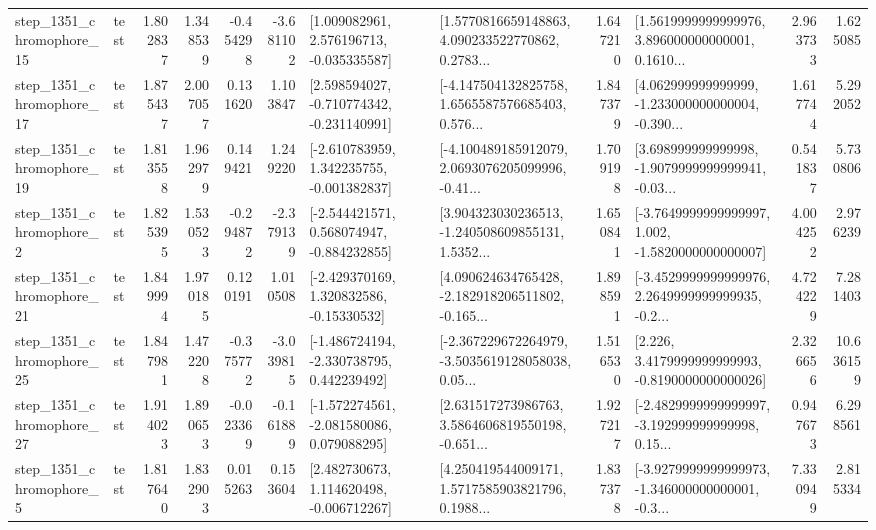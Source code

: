 \begin{tabular}{llrrrrllrlrr}
 step\_1351\_chromophore\_15 &      test &      1.802837 &    1.348539 &     -0.454298 & -3.681102 &    [1.009082961, 2.576196713, -0.035335587] &  [1.5770816659148863, 4.090233522770862, 0.2783... &       1.647210 &  [1.5619999999999976, 3.896000000000001, 0.1610... &            2.963733 &          1.625085 \\
 step\_1351\_chromophore\_17 &      test &      1.875437 &    2.007057 &      0.131620 &  1.103847 &   [2.598594027, -0.710774342, -0.231140991] &  [-4.147504132825758, 1.6565587576685403, 0.576... &       1.847379 &  [4.062999999999999, -1.233000000000004, -0.390... &            1.617744 &          5.292052 \\
 step\_1351\_chromophore\_19 &      test &      1.813558 &    1.962979 &      0.149421 &  1.249220 &   [-2.610783959, 1.342235755, -0.001382837] &  [-4.100489185912079, 2.0693076205099996, -0.41... &       1.709198 &  [3.698999999999998, -1.9079999999999941, -0.03... &            0.541837 &          5.730806 \\
  step\_1351\_chromophore\_2 &      test &      1.825395 &    1.530523 &     -0.294872 & -2.379139 &   [-2.544421571, 0.568074947, -0.884232855] &  [3.904323030236513, -1.240508609855131, 1.5352... &       1.650841 &  [-3.7649999999999997, 1.002, -1.5820000000000007] &            4.004252 &          2.976239 \\
 step\_1351\_chromophore\_21 &      test &      1.849994 &    1.970185 &      0.120191 &  1.010508 &    [-2.429370169, 1.320832586, -0.15330532] &  [4.090624634765428, -2.182918206511802, -0.165... &       1.898591 &  [-3.4529999999999976, 2.2649999999999935, -0.2... &            4.724229 &          7.281403 \\
 step\_1351\_chromophore\_25 &      test &      1.847981 &    1.472208 &     -0.375772 & -3.039815 &   [-1.486724194, -2.330738795, 0.442239492] &  [-2.367229672264979, -3.5035619128058038, 0.05... &       1.516530 &   [2.226, 3.4179999999999993, -0.8190000000000026] &            2.326656 &         10.636159 \\
 step\_1351\_chromophore\_27 &      test &      1.914023 &    1.890653 &     -0.023369 & -0.161889 &   [-1.572274561, -2.081580086, 0.079088295] &  [2.631517273986763, 3.5864606819550198, -0.651... &       1.927217 &  [-2.4829999999999997, -3.192999999999998, 0.15... &            0.947673 &          6.298561 \\
  step\_1351\_chromophore\_5 &      test &      1.817640 &    1.832903 &      0.015263 &  0.153604 &    [2.482730673, 1.114620498, -0.006712267] &  [4.250419544009171, 1.5717585903821796, 0.1988... &       1.837378 &  [-3.9279999999999973, -1.346000000000001, -0.3... &            7.330949 &          2.815334 \\

\end{tabular}
